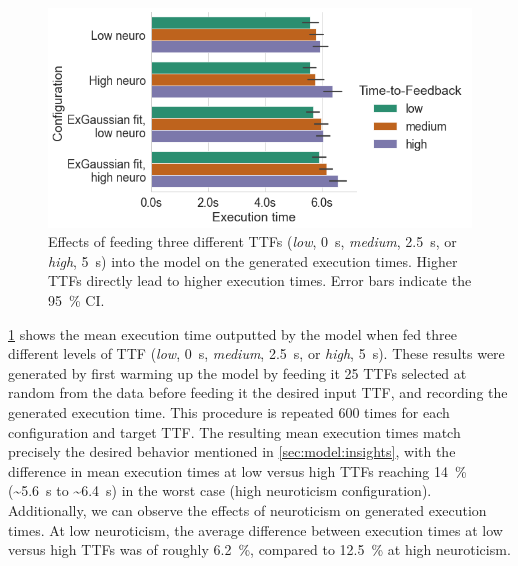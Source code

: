\begin{figure}
    \centering
    \includegraphics[width=.9\columnwidth]{figs/new_model/ttf_to_exectime}
    \caption{%
        Effects of feeding three different \glspl{TTF} (\emph{low}, \SI{0}{\second}, \emph{medium}, \SI{2.5}{\second}, or \emph{high}, \SI{5}{\second}) into the model on the generated execution times.
        Higher \glspl{TTF} directly lead to higher execution times.
        Error bars indicate the \SI{95}{\percent} \gls{CI}.
    }\label{fig:ttf_to_exectime}
\end{figure}

\cref{fig:ttf_to_exectime} shows the mean execution time outputted by the model when fed three different levels of \gls{TTF} (\emph{low}, \SI{0}{\second}, \emph{medium}, \SI{2.5}{\second}, or \emph{high}, \SI{5}{\second}).
These results were generated by first warming up the model by feeding it \num{25} \glspl{TTF} selected at random from the data before feeding it the desired input \gls{TTF}, and recording the generated execution time.
This procedure is repeated \num{600} times for each configuration and target \gls{TTF}.
The resulting mean execution times match precisely the desired behavior mentioned in \cref{sec:model:insights}, with the difference in mean execution times at low versus high \glspl{TTF} reaching \SI{14}{\percent} (\textasciitilde\SI{5.6}{\second} to \textasciitilde\SI{6.4}{\second}) in the worst case (high neuroticism configuration).
Additionally, we can observe the effects of neuroticism on generated execution times.
At low neuroticism, the average difference between execution times at low versus high \glspl{TTF} was of roughly \SI{6.2}{\percent}, compared to \SI{12.5}{\percent} at high neuroticism.

